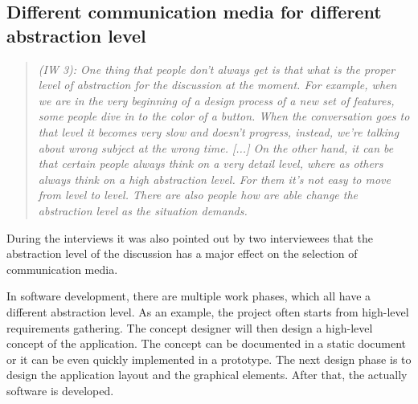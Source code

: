 \documentclass[english,12pt,a4paper,pdftex]{article}
\newcommand{\q}[2]{
\begin{quote}
\emph{(IW #1): #2}
\end{quote}}
\begin{document}
\subsection{Different communication media for different abstraction level}

\q{3}{One thing that people don't always get is that what is the proper level of abstraction for the discussion at the moment. For example, when we are in the very beginning of a design process of a new set of features, some people dive in to the color of a button. When the conversation goes to that level it becomes very slow and doesn't progress, instead, we're talking about wrong subject at the wrong time. [...] On the other hand, it can be that certain people always think on a very detail level, where as others always think on a high abstraction level. For them it's not easy to move from level to level. There are also people how are able change the abstraction level as the situation demands.}

During the interviews it was also pointed out by two interviewees that the abstraction level of the discussion has a major effect on the selection of communication media.

In software development, there are multiple work phases, which all have a different abstraction level. As an example, the project often starts from high-level requirements gathering. The concept designer will then design a high-level concept of the application. The concept can be documented in a static document or it can be even quickly implemented in a prototype. The next design phase is to design the application layout and the graphical elements. After that, the actually software is developed.
\end{document}
